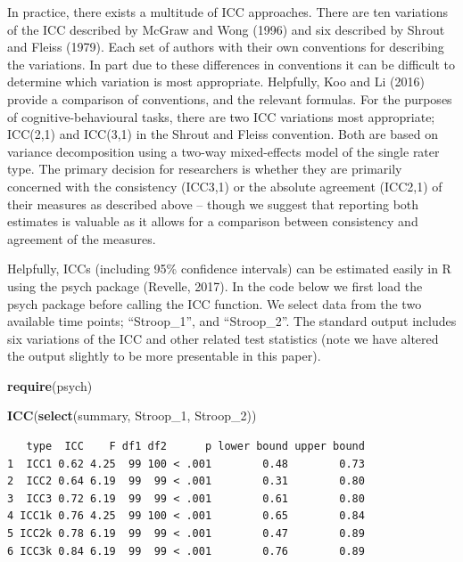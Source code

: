 \documentclass[english,,man,floatsintext]{apa6}
\newenvironment{Shaded}{\begin{snugshade}}{\end{snugshade}}
\newcommand{\DecValTok}[1]{\textcolor[rgb]{0.00,0.00,0.81}{#1}}
\newcommand{\KeywordTok}[1]{\textcolor[rgb]{0.13,0.29,0.53}{\textbf{#1}}}
\newcommand{\NormalTok}[1]{#1}
\begin{document}
In practice, there exists a multitude of ICC approaches. There are ten variations of the ICC described by McGraw and Wong (1996) and six described by Shrout and Fleiss (1979). Each set of authors with their own conventions for describing the variations. In part due to these differences in conventions it can be difficult to determine which variation is most appropriate. Helpfully, Koo and Li (2016) provide a comparison of conventions, and the relevant formulas. For the purposes of cognitive-behavioural tasks, there are two ICC variations most appropriate; ICC(2,1) and ICC(3,1) in the Shrout and Fleiss convention. Both are based on variance decomposition using a two-way mixed-effects model of the single rater type. The primary decision for researchers is whether they are primarily concerned with the consistency (ICC3,1) or the absolute agreement (ICC2,1) of their measures as described above -- though we suggest that reporting both estimates is valuable as it allows for a comparison between consistency and agreement of the measures.

Helpfully, ICCs (including 95\% confidence intervals) can be estimated easily in R using the psych package (Revelle, 2017). In the code below we first load the psych package before calling the ICC function. We select data from the two available time points; \enquote{Stroop\_1}, and \enquote{Stroop\_2}. The standard output includes six variations of the ICC and other related test statistics (note we have altered the output slightly to be more presentable in this paper).

\begin{Shaded}
\begin{Highlighting}[]
\KeywordTok{require}\NormalTok{(psych)}

\KeywordTok{ICC}\NormalTok{(}\KeywordTok{select}\NormalTok{(summary, Stroop_}\DecValTok{1}\NormalTok{, Stroop_}\DecValTok{2}\NormalTok{))}
\end{Highlighting}
\end{Shaded}

\begin{verbatim}
   type  ICC    F df1 df2      p lower bound upper bound
1  ICC1 0.62 4.25  99 100 < .001        0.48        0.73
2  ICC2 0.64 6.19  99  99 < .001        0.31        0.80
3  ICC3 0.72 6.19  99  99 < .001        0.61        0.80
4 ICC1k 0.76 4.25  99 100 < .001        0.65        0.84
5 ICC2k 0.78 6.19  99  99 < .001        0.47        0.89
6 ICC3k 0.84 6.19  99  99 < .001        0.76        0.89
\end{verbatim}
\end{document}
